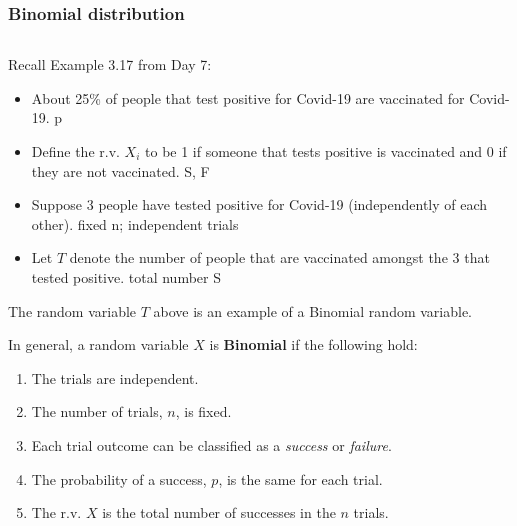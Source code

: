 \documentclass[12pt]{amsart}
\begin{document}
{\newpage
\subsubsection{Binomial distribution}  $ \ $



\vspace{0.5cm}
Recall Example 3.17 from Day 7:
\begin{itemize}
\item About 25\% of people that test positive for Covid-19 are vaccinated for Covid-19.
\color{blue}p\color{black}
\item Define the r.v. $X_i$ to be 1 if someone that tests positive is vaccinated and 0 if they are not vaccinated. 
\color{blue}S, F\color{black}
\item Suppose 3 people have tested positive for Covid-19 (independently of each other). 
\color{blue}fixed n; independent trials\color{black}
\item Let $T$ denote the number of people that are vaccinated amongst the 3 that tested positive.
\color{blue}total number S\color{black}
\end{itemize}

\vspace{0.5cm}
The random variable $T$ above is an example of a Binomial random variable. \newline

\vspace{0.5cm}

In general, a random variable $X$ is \textbf{Binomial} if the following hold:

\vspace{0.5cm}
\begin{enumerate}
\item The trials are independent.
\item The number of trials, $n$, is fixed. 
\item Each trial outcome can be classified as a \emph{success} or \emph{failure}.
\item The probability of a success, $p$, is the same for each trial.
\item The r.v. $X$ is the total number of successes in the $n$ trials.
\end{enumerate}



\vspace{.5cm}

}
\end{document}
